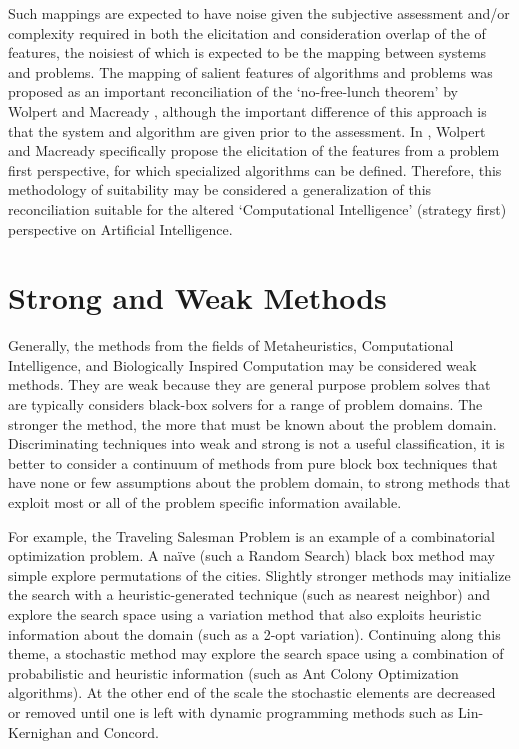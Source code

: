 \documentclass[a4paper, 11pt]{article}
\begin{document}
Such mappings are expected to have noise given the subjective assessment and/or complexity required in both the elicitation and consideration overlap of the of features, the noisiest of which is expected to be the mapping between systems and problems. 
The mapping of salient features of algorithms and problems was proposed as an important reconciliation of the `no-free-lunch theorem' by Wolpert and Macready \cite{Wolpert1997}, although the important difference of this approach is that the system and algorithm are given prior to the assessment. In \cite{Wolpert1995}, Wolpert and Macready specifically propose the elicitation of the features from a problem first perspective, for which specialized algorithms can be defined. Therefore, this methodology of suitability may be considered a generalization of this reconciliation suitable for the altered `Computational Intelligence' (strategy first) perspective on Artificial Intelligence.

%
%
\section{Strong and Weak Methods}
\label{sec:strong_methods}
Generally, the methods from the fields of Metaheuristics, Computational Intelligence, and Biologically Inspired Computation may be considered weak methods. They are weak because they are general purpose problem solves that are typically considers black-box solvers for a range of problem domains. The stronger the method, the more that must be known about the problem domain.
Discriminating techniques into weak and strong is not a useful classification, it is better to consider a continuum of methods from pure block box techniques that have none or few assumptions about the problem domain, to strong methods that exploit most or all of the problem specific information available.

For example, the Traveling Salesman Problem is an example of a combinatorial optimization problem. A na\"ive (such a Random Search) black box method may simple explore permutations of the cities. Slightly stronger methods may initialize the search with a heuristic-generated technique (such as nearest neighbor) and explore the search space using a variation method that also exploits heuristic information about the domain (such as a 2-opt variation). Continuing along this theme, a stochastic method may explore the search space using a combination of probabilistic and heuristic information (such as Ant Colony Optimization algorithms). At the other end of the scale the stochastic elements are decreased or removed until one is left with  dynamic programming methods such as Lin-Kernighan and Concord.
\end{document}
